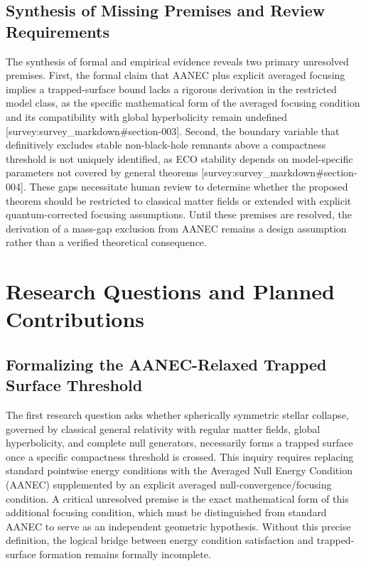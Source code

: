 \documentclass[conference]{IEEEtran}
\begin{document}
\subsection{Synthesis of Missing Premises and Review Requirements}
The synthesis of formal and empirical evidence reveals two primary unresolved premises. First, the formal claim that AANEC plus explicit averaged focusing implies a trapped-surface bound lacks a rigorous derivation in the restricted model class, as the specific mathematical form of the averaged focusing condition and its compatibility with global hyperbolicity remain undefined [survey:survey\_markdown\#section-003]. Second, the boundary variable that definitively excludes stable non-black-hole remnants above a compactness threshold is not uniquely identified, as ECO stability depends on model-specific parameters not covered by general theorems [survey:survey\_markdown\#section-004]. These gaps necessitate human review to determine whether the proposed theorem should be restricted to classical matter fields or extended with explicit quantum-corrected focusing assumptions. Until these premises are resolved, the derivation of a mass-gap exclusion from AANEC remains a design assumption rather than a verified theoretical consequence.

\section{Research Questions and Planned Contributions}
\subsection{Formalizing the AANEC-Relaxed Trapped Surface Threshold}
The first research question asks whether spherically symmetric stellar collapse, governed by classical general relativity with regular matter fields, global hyperbolicity, and complete null generators, necessarily forms a trapped surface once a specific compactness threshold is crossed. This inquiry requires replacing standard pointwise energy conditions with the Averaged Null Energy Condition (AANEC) supplemented by an explicit averaged null-convergence/focusing condition. A critical unresolved premise is the exact mathematical form of this additional focusing condition, which must be distinguished from standard AANEC to serve as an independent geometric hypothesis. Without this precise definition, the logical bridge between energy condition satisfaction and trapped-surface formation remains formally incomplete.
\end{document}
